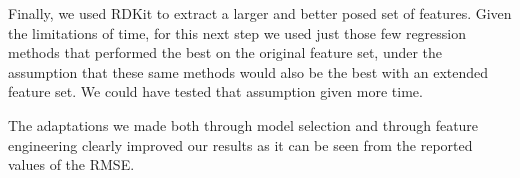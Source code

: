 \documentclass[11pt]{article}
\begin{document}
Finally, we used RDKit to extract a larger and better posed set of features.  Given the limitations of time, for this next step we used just those few regression methods that performed the best on the original feature set, under the assumption that these same methods would also be the best with an extended feature set.  We could have tested that assumption given more time.

 The adaptations we made both through model selection and through feature engineering clearly improved our results as it can be seen from the reported values of the RMSE.
\end{document}
